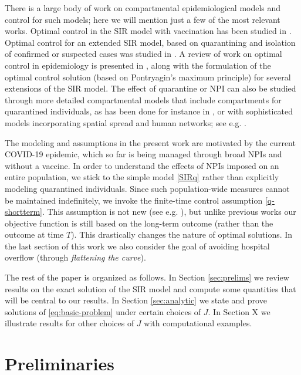 \documentclass[english,12pt,letter]{article}
\begin{document}
There is a large body of work on compartmental epidemiological models
and control for such models; here we will mention just a few of the most
relevant works.
Optimal control in the SIR model with vaccination has been studied in \cite{kar2011stability}.
Optimal control for an extended SIR model, based on quarantining and isolation
of confirmed or suspected cases was studied in \cite{yan2008optimal}.  
A review of work on optimal control in epidemiology is presented in \cite{sharomi2017optimal},
along with the formulation of the optimal control solution (based on
Pontryagin's maximum principle) for several extensions of the SIR model.
The effect of quarantine or NPI can also be studied through more
detailed compartmental models that include compartments for quarantined individuals,
as has been done for instance in \cite{safi2013dynamics,agusto2013optimal}, or with
sophisticated models incorporating spatial spread and human networks;
see e.g. \cite{ferguson2005strategies}.

The modeling and assumptions in the present work are motivated by the
current COVID-19 epidemic, which so far is being managed through broad
NPIs and without a vaccine.  In order to understand the effects of NPIs
imposed on an entire population, we stick to the simple model \eqref{SIRq}
rather than explicitly modeling quarantined individuals.
Since such population-wide measures cannot be maintained indefinitely, we
invoke the finite-time control assumption \eqref{q-shortterm}.
This assumption is not new (see e.g. \cite{greenhalgh1988some}),
but unlike previous works our objective function is still based on the
long-term outcome (rather than the outcome at time $T$).
This drastically changes the nature of optimal solutions.
In the last section of this work we also consider the goal of avoiding
hospital overflow (through {\em flattening the curve}).

The rest of the paper is organized as follows.  In Section \ref{sec:prelims} we
review results on the exact solution of the SIR model and compute some quantities
that will be central to our results.  In Section \ref{sec:analytic} we state
and prove solutions of \eqref{eq:basic-problem} under certain choices of $J$.
In Section X we illustrate results for other choices of $J$ with computational
examples.

\section{Preliminaries\label{sec:prelims}}
\end{document}
